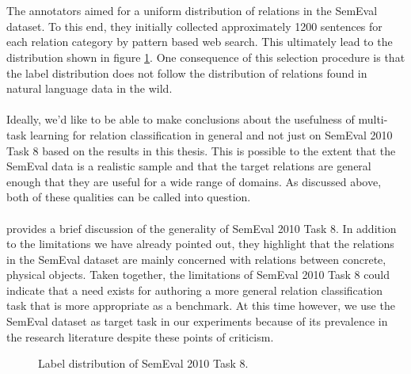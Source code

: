 \\\\
The annotators aimed for a uniform distribution of relations in the SemEval dataset. To this end, they initially collected approximately 1200 sentences for each relation category by pattern based web search. This ultimately lead to the distribution shown in figure \ref{semeval_dist}. One consequence of this selection procedure is that the label distribution does not follow the distribution of relations found in natural language data in the wild.
\\\\
Ideally, we'd like to be able to make conclusions about the usefulness of multi-task learning for relation classification in general and not just on SemEval 2010 Task 8 based on the results in this thesis. This is possible to the extent that the SemEval data is a realistic sample and that the target relations are general enough that they are useful for a wide range of domains. As discussed above, both of these qualities can be called into question.
\\\\
\citet{handschuh2016} provides a brief discussion of the generality of SemEval 2010 Task 8. In addition to the limitations we have already pointed out, they highlight that the relations in the SemEval dataset are mainly concerned with relations between concrete, physical objects. Taken together, the limitations of SemEval 2010 Task 8 could indicate that a need exists for authoring a more general relation classification task that is more appropriate as a benchmark. At this time however, we use the SemEval dataset as target task in our experiments because of its prevalence in the research literature despite these points of criticism.

\begin{figure}
	\center
	
	\caption{Label distribution of SemEval 2010 Task 8.}
	\label{semeval_dist}
\end{figure}

